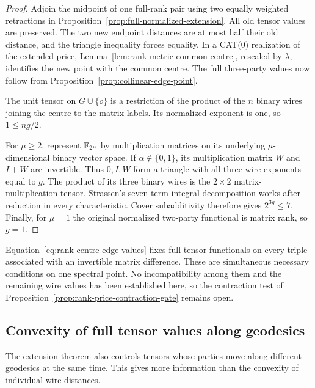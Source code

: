 \begin{proof}
Adjoin the midpoint of one full-rank pair using two equally weighted
retractions in Proposition~\ref{prop:full-normalized-extension}.
All old tensor values are preserved. The two new endpoint distances
are at most half their old distance, and the triangle inequality
forces equality. In a CAT(0) realization of the extended price,
Lemma~\ref{lem:rank-metric-common-centre}, rescaled by $\lambda$,
identifies the new point with the common centre. The full three-party
values now follow from Proposition~\ref{prop:collinear-edge-point}.

The unit tensor on $G\cup\{o\}$ is a restriction of the product of
the $n$ binary wires joining the centre to the matrix labels. Its
normalized exponent is one, so $1\le ng/2$.

For $\mu\ge2$, represent $\mathbb F_{2^\mu}$ by multiplication matrices
on its underlying $\mu$-dimensional binary vector space. If
$\alpha\notin\{0,1\}$, its multiplication matrix $W$ and $I+W$
are invertible. Thus $0,I,W$ form a triangle with all three wire
exponents equal to $g$. The product of its three binary wires is
the $2\times2$ matrix-multiplication tensor. Strassen's seven-term
integral decomposition \cite[pp.~354--355]{Strassen1969} works
after reduction in every characteristic. Cover subadditivity
therefore gives $2^{3g}\le7$. Finally, for $\mu=1$ the original
normalized two-party functional is matrix rank, so $g=1$.
\end{proof}

Equation~\eqref{eq:rank-centre-edge-values} fixes full tensor
functionals on every triple associated with an invertible matrix
difference. These are simultaneous necessary conditions on one
spectral point. No incompatibility among them and the remaining
wire values has been established here, so the contraction test
of Proposition~\ref{prop:rank-price-contraction-gate} remains open.

\subsection{Convexity of full tensor values along geodesics}

The extension theorem also controls tensors whose parties move along
different geodesics at the same time. This gives more information than
the convexity of individual wire distances.

